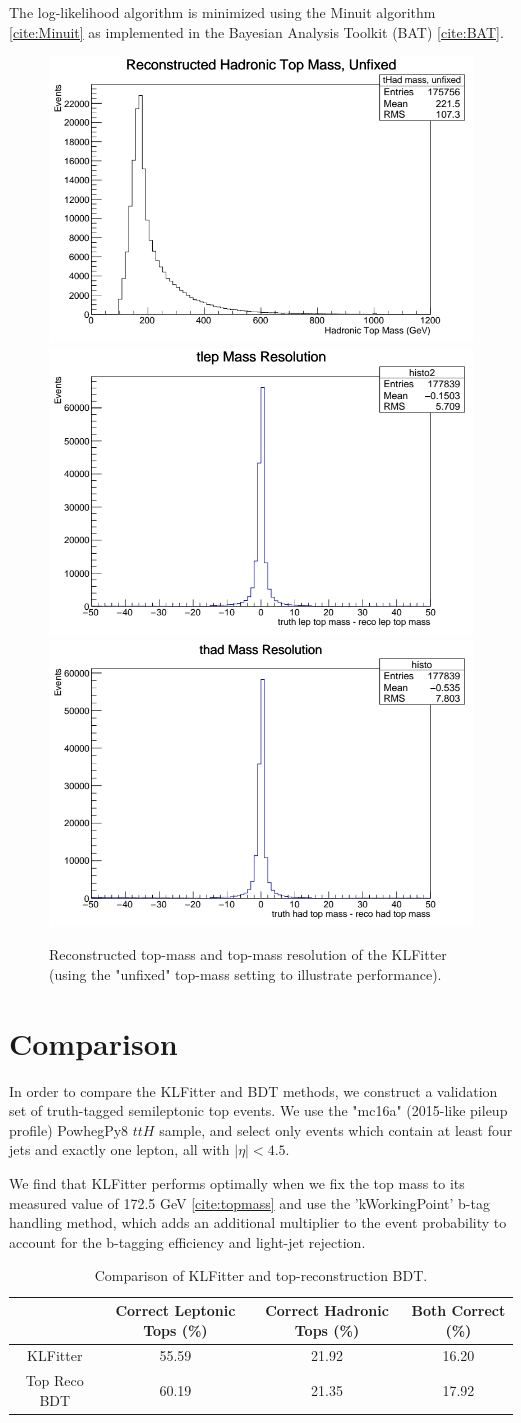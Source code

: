 The log-likelihood algorithm is minimized using the Minuit algorithm \ref{cite:Minuit} as implemented in the Bayesian Analysis Toolkit (BAT) \ref{cite:BAT}.

\begin{figure}
	\centering
	\includegraphics[width=0.31\linewidth]{figures/KLFitter/KLFittertopmass.png}
	\includegraphics[width=0.31\linewidth]{figures/KLFitter/KLfitter1.png}
	\includegraphics[width=0.31\linewidth]{figures/KLFitter/KLfitter2.png}
	\caption{Reconstructed top-mass and top-mass resolution of the KLFitter (using the "unfixed" top-mass setting to illustrate performance).}
	\label{fig:sel_topReco_retrain}
\end{figure}

\section{Comparison} \label{sec:comparison} 

In order to compare the KLFitter and BDT methods, we construct a validation set of truth-tagged semileptonic top events. We use the "mc16a" (2015-like pileup profile) PowhegPy8 $ttH$ sample, and select only events which contain at least four jets and exactly one lepton, all with $|\eta|< 4.5$.

We find that KLFitter performs optimally when we fix the top mass to its measured value of 172.5 GeV \ref{cite:topmass} and use the 'kWorkingPoint' b-tag handling method, which adds an additional multiplier to the event probability to account for the b-tagging efficiency and light-jet rejection. 

\begin{table}[h]
    \centering
    \begin{tabular}{|c|c|c|c|}
    \hline
    & Correct Leptonic Tops (\%) & Correct Hadronic Tops (\%) & Both Correct (\%) \\ \hline
    KLFitter & 55.59 & 21.92 & 16.20 \\ \hline
    Top Reco BDT & 60.19 & 21.35 & 17.92 \\ \hline   	
    \end{tabular}
    \caption{Comparison of KLFitter and top-reconstruction BDT.}
    \label{KLFitterTable}
\end{table}
